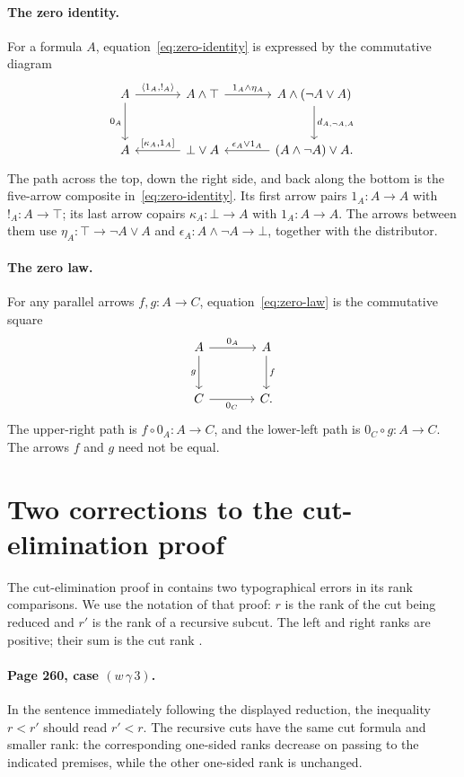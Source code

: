 \documentclass[11pt]{article}
\begin{document}
\paragraph{The zero identity.}
For a formula $A$, equation~\eqref{eq:zero-identity} is expressed by
the commutative diagram
\[
\begin{tikzcd}[column sep=large,row sep=large]
 A\arrow[r,"{\langle1_A,!_A\rangle}"]\arrow[d,"0_A"']
   &A\wedge\top\arrow[r,"1_A\wedge\eta_A"]
   &A\wedge(\neg A\vee A)\arrow[d,"d_{A,\neg A,A}"]\\
 A
   &\bot\vee A\arrow[l,"{[\kappa_A,1_A]}"']
   &(A\wedge\neg A)\vee A\arrow[l,"\epsilon_A\vee1_A"'].
\end{tikzcd}
\]
The path across the top, down the right side, and back along the
bottom is the five-arrow composite in~\eqref{eq:zero-identity}.
Its first arrow pairs $1_A:A\to A$ with $!_A:A\to\top$;
its last arrow copairs $\kappa_A:\bot\to A$ with $1_A:A\to A$.
The arrows between them use
$\eta_A:\top\to\neg A\vee A$ and
$\epsilon_A:A\wedge\neg A\to\bot$, together with the distributor.

\paragraph{The zero law.}
For any parallel arrows $f,g:A\to C$,
equation~\eqref{eq:zero-law} is the commutative square
\[
\begin{tikzcd}[column sep=large,row sep=large]
 A\arrow[r,"0_A"]\arrow[d,"g"']&A\arrow[d,"f"]\\
 C\arrow[r,"0_C"']&C.
\end{tikzcd}
\]
The upper-right path is $f\circ0_A:A\to C$, and the lower-left
path is $0_C\circ g:A\to C$. The arrows $f$ and $g$ need not be equal.

\clearpage
\section{Two corrections to the cut-elimination proof}\label{app:cut-errata}

The cut-elimination proof in \cite[\S11.2]{DP} contains two
typographical errors in its rank comparisons. We use the notation of
that proof: $r$ is the rank of the cut being reduced and $r'$ is the
rank of a recursive subcut. The left and right ranks are positive;
their sum is the cut rank \cite[p.~249]{DP}.

\paragraph{Page 260, case $(w\,\gamma\,3)$.}
In the sentence immediately following the displayed reduction,
the inequality $r<r'$ should read $r'<r$.
The recursive cuts have the same cut formula and smaller rank:
the corresponding one-sided ranks decrease on passing to the
indicated premises, while the other one-sided rank is unchanged.
\end{document}
